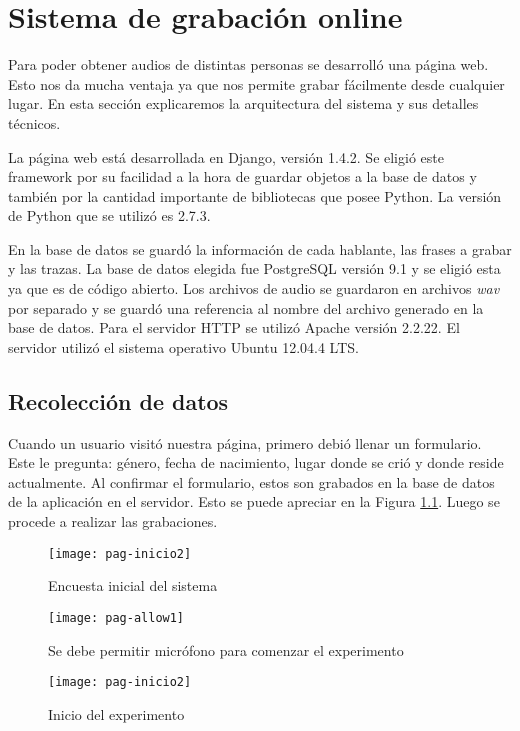 \chapter{Sistema de grabación online}

Para poder obtener audios de distintas personas se desarrolló una página web. Esto nos da mucha ventaja ya que nos permite grabar fácilmente desde cualquier lugar. En esta sección explicaremos la arquitectura del sistema y sus detalles técnicos.

La página web está desarrollada en Django, versión 1.4.2. Se eligió este framework por su facilidad a la hora de guardar objetos a la base de datos y también por la cantidad importante de bibliotecas que posee Python. La versión de Python que se utilizó es 2.7.3. 

En la base de datos se guardó la información de cada hablante, las frases a grabar y las trazas. La base de datos elegida fue PostgreSQL versión 9.1 y se eligió esta ya que es de código abierto. Los archivos de audio se guardaron en archivos \textit{wav} por separado y se guardó una referencia al nombre del archivo generado en la base de datos. Para el servidor HTTP se utilizó Apache versión 2.2.22. El servidor utilizó el sistema operativo Ubuntu 12.04.4 LTS.

\section{Recolección de datos}

Cuando un usuario visitó nuestra página, primero debió llenar un formulario. Este le pregunta: género, fecha de nacimiento, lugar donde se crió y donde reside actualmente. Al confirmar el formulario, estos son grabados en la base de datos de la aplicación en el servidor. Esto se puede apreciar en la Figura \ref{figEncuesta}. Luego se procede a realizar las grabaciones. 

\begin{figure}[h!]
    \centerline{\texttt{[image: pag-inicio2]} }
    \caption{Encuesta inicial del sistema}
    \label{figEncuesta}
\end{figure}

\begin{figure}[h!]
    \centerline{\texttt{[image: pag-allow1]} }
    \caption{Se debe permitir micrófono para comenzar el experimento}
    \label{allowmic}
\end{figure}

\begin{figure}[h!]
    \centerline{\texttt{[image: pag-inicio2]} }
    \caption{Inicio del experimento}
    \label{inicio}
\end{figure}

